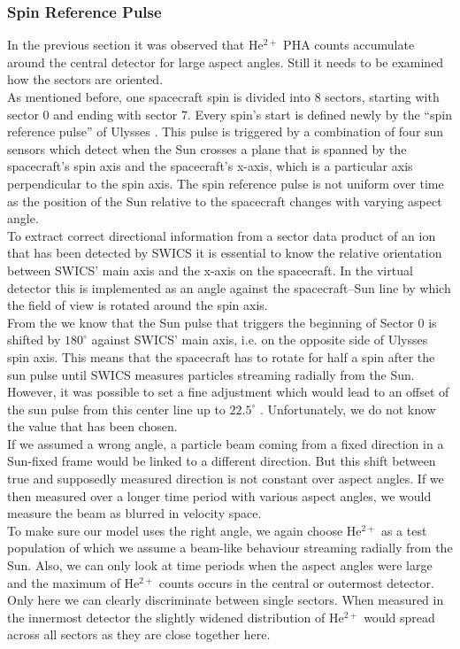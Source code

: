 \subsubsection{Spin Reference Pulse}
In the previous section it was observed that $\mathrm{He^{2+}}$ PHA counts accumulate around the central detector for large aspect angles. Still it needs to be examined how the sectors are oriented.\\
As mentioned before, one spacecraft spin is divided into 8 sectors, starting with sector 0 and ending with sector 7. Every spin's start is defined newly by the ``spin reference pulse'' of Ulysses \citep{hiscale}. This pulse is triggered by a combination of four sun sensors which detect when the Sun crosses a plane that is spanned by the spacecraft's spin axis and the spacecraft's x-axis, which is a particular axis perpendicular to the spin axis. The spin reference pulse is not uniform over time as the position of the Sun relative to the spacecraft changes with varying aspect angle.\\
To extract correct directional information from a sector data product of an ion that has been detected by SWICS it is essential to know the relative orientation between SWICS' main axis and the x-axis on the spacecraft. In the virtual detector this is implemented as an angle against the spacecraft--Sun line by which the field of view is rotated around the spin axis.\\
From the \citet[][p. 20-22]{swics_dpu} we know that the Sun pulse that triggers the beginning of Sector 0 is shifted by $180^\circ$ against SWICS' main axis, i.e. on the opposite side of Ulysses spin axis. This means that the spacecraft has to rotate for half a spin after the sun pulse until SWICS measures particles streaming radially from the Sun. However, it was possible to set a fine adjustment which would lead to an offset of the sun pulse from this center line up to $22.5^\circ$ \citet[][S.48]{swics_dpu}. Unfortunately, we do not know the value that has been chosen.
\\
If we assumed a wrong angle, a particle beam coming from a fixed direction in a Sun-fixed frame would be linked to a different direction. But this shift between true and supposedly measured direction is not constant over aspect angles. If we then measured over a longer time period with various aspect angles, we would measure the beam as blurred in velocity space.
\\
To make sure our model uses the right angle, we again choose $\mathrm{He^{2+}}$ as a test population of which we assume a beam-like behaviour streaming radially from the Sun. Also, we can only look at time periods when the aspect angles were large and the maximum of $\mathrm{He^{2+}}$ counts occurs in the central or outermost detector. Only here we can clearly discriminate between single sectors. When measured in the innermost detector the slightly widened distribution of $\mathrm{He^{2+}}$ would spread across all sectors as they are close together here.

